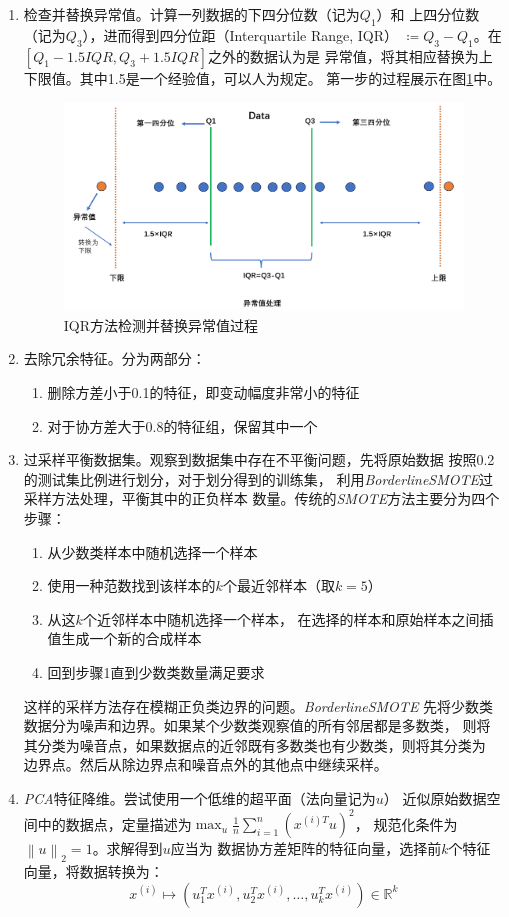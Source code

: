 \begin{enumerate}
    \item 检查并替换异常值。计算一列数据的下四分位数（记为$Q_1$）和
    上四分位数（记为$Q_3$），进而得到四分位距（Interquartile Range, IQR）
    $\coloneqq Q_3-Q_1$。在$[Q_1-1.5IQR, Q_3+1.5IQR]$之外的数据认为是
    异常值，将其相应替换为上下限值。其中1.5是一个经验值，可以人为规定。
    第一步的过程展示在图\ref{fig:IQR-outlier-detection}中。
    \begin{figure}[h]
        \centering
        \includegraphics[width=.6\textwidth]{images/IQR_outlier_selection.png}
        \caption{IQR方法检测并替换异常值过程}
        \label{fig:IQR-outlier-detection}
    \end{figure}
    \item 去除冗余特征。分为两部分：
    \begin{enumerate}
        \item 删除方差小于0.1的特征，即变动幅度非常小的特征
        \item 对于协方差大于0.8的特征组，保留其中一个
    \end{enumerate}
    \item 过采样平衡数据集。观察到数据集中存在不平衡问题，先将原始数据
    按照0.2的测试集比例进行划分，对于划分得到的训练集，
    利用\textit{BorderlineSMOTE}过采样方法处理，平衡其中的正负样本
    数量。传统的\textit{SMOTE}方法主要分为四个步骤：
    \begin{enumerate}
        \item 从少数类样本中随机选择一个样本
        \item 使用一种范数找到该样本的$k$个最近邻样本（取$k=5$）
        \item 从这$k$个近邻样本中随机选择一个样本，
        在选择的样本和原始样本之间插值生成一个新的合成样本
        \item 回到步骤1直到少数类数量满足要求
    \end{enumerate}
    这样的采样方法存在模糊正负类边界的问题。\textit{BorderlineSMOTE}
    先将少数类数据分为噪声和边界。如果某个少数类观察值的所有邻居都是多数类，
    则将其分类为噪音点，如果数据点的近邻既有多数类也有少数类，则将其分类为
    边界点。然后从除边界点和噪音点外的其他点中继续采样。
    \item \textit{PCA}特征降维。尝试使用一个低维的超平面（法向量记为$u$）
    近似原始数据空间中的数据点，定量描述为$\max_u \frac{1}{n}\sum_{i=1}^{n}(x^{(i)T}u)^2$，
    规范化条件为$\left\lVert u\right\rVert _2 =1$。求解得到$u$应当为
    数据协方差矩阵的特征向量，选择前$k$个特征向量，将数据转换为：
    \begin{equation*}
    x^{(i)} \mapsto (u_1^T x^{(i)},u_2^T x^{(i)},\ldots,u_k^T x^{(i)})\in
    \mathbb{R}^k
    \end{equation*}
\end{enumerate}

